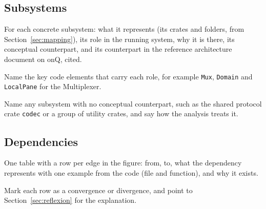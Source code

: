 \subsection{Subsystems}
\label{sec:concrete-subsystems}

\begin{requirements}
  \item For each concrete subsystem: what it represents (its crates and folders, from Section~\ref{sec:mapping}), its role in the running system, why it is there, its conceptual counterpart, and its counterpart in the reference architecture document on onQ, cited.
  \item Name the key code elements that carry each role, for example \texttt{Mux}, \texttt{Domain} and \texttt{LocalPane} for the Multiplexer.
  \item Name any subsystem with no conceptual counterpart, such as the shared protocol crate \texttt{codec} or a group of utility crates, and say how the analysis treats it.
\end{requirements}

\subsection{Dependencies}
\label{sec:concrete-dependencies}

\begin{requirements}
  \item One table with a row per edge in the figure: from, to, what the dependency represents with one example from the code (file and function), and why it exists.
  \item Mark each row as a convergence or divergence, and point to Section~\ref{sec:reflexion} for the explanation.
\end{requirements}
